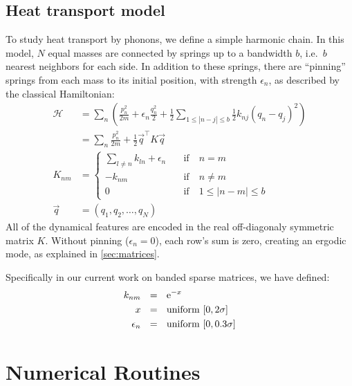 \section{Heat transport model}\label{sec:app_heat}

To study heat transport by phonons, we define a simple harmonic chain.
In this model, $N$ equal masses are connected by springs 
up to a bandwidth $b$, i.e.\ $b$ nearest neighbors for each side. 
In addition to these springs, there are ``pinning'' springs from each
mass to its initial position, with
strength $\epsilon_n$, as described by the classical Hamiltonian:
%
\begin{align}
\mathcal{H} &= \sum_n \left( \frac{p_n^2}{2m} +\epsilon_n\frac{q_n^2}{2}+ \frac{1}{2}\sum_{1\le |n-j|\le b} \frac{1}{2}k_{nj} (q_n-q_j)^2 \right) \\
            &= \sum_{n} \frac{p_n^2}{2m} +  \frac{1}{2}\vec{q}^{\intercal} K \vec{q} \\
            K_{nm} &= \begin{cases} 
            \sum_{l\ne n} k_{ln} +\epsilon_n \quad &\textrm{if}\quad n=m \label{eq:K_matrix}\\ 
            - k_{nm}  \quad &\textrm{if}\quad n\ne m \\
            0 \quad &\textrm{if}\quad 1\le |n-m|\le b
            \end{cases}\\
            \vec{q} &= (q_1,q_2,\ldots,q_N)
\end{align}
%
All of the dynamical features are encoded in the real off-diagonaly symmetric matrix $K$.
Without pinning ($\epsilon_n=0$), each row's sum is zero,
creating an ergodic mode, as explained in \autoref{sec:matrices}.


Specifically in our current work on banded sparse matrices, we have defined:
\begin{align}
k_{nm} \ \ &=\ \ \mbox{e}^{-x} \\
x\ \ &= \ \ \textrm{uniform } [0,2\sigma]\\
\epsilon_n \ \ &= \ \ \textrm{uniform } [0,0.3\sigma]
\end{align}




\chapter{Numerical Routines}

